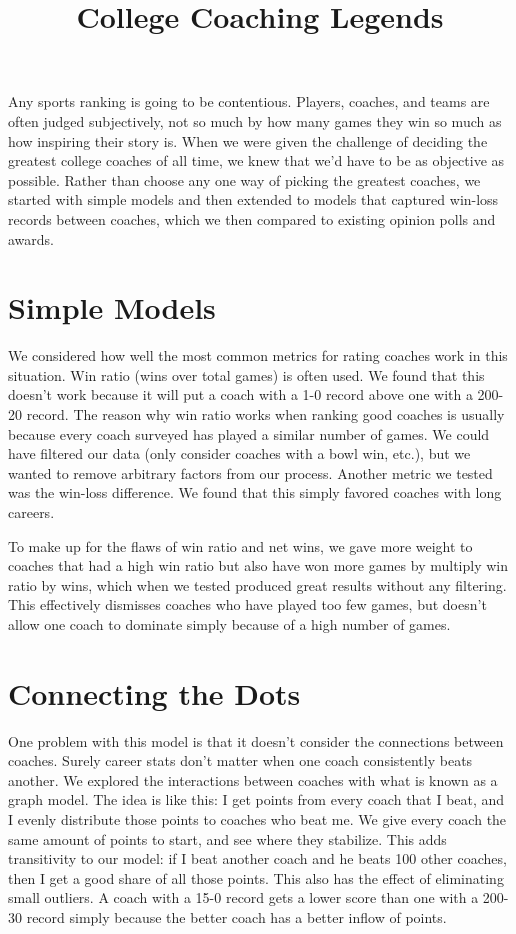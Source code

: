 \documentclass[12pt]{article}
\begin{document}
\title{College Coaching Legends}
\date{}

\maketitle
\vspace{-10ex}
Any sports ranking is going to be contentious. Players, coaches, and teams are often judged subjectively, not so much by how many games they win so much as how inspiring their story is. When we were given the challenge of deciding the greatest college coaches of all time, we knew that we'd have to be as objective as possible. Rather than choose any one way of picking the greatest coaches, we started with simple models and then extended to models that captured win-loss records between coaches, which we then compared to existing opinion polls and awards.

\section{Simple Models}
We considered how well the most common metrics for rating coaches work in this situation. Win ratio (wins over total games) is often used. We found that this doesn't work because it will put a coach with a 1-0 record above one with a 200-20 record. The reason why win ratio works when ranking good coaches is usually because every coach surveyed has played a similar number of games. We could have filtered our data (only consider coaches with a bowl win, etc.), but we wanted to remove arbitrary factors from our process. Another metric we tested was the win-loss difference. We found that this simply favored coaches with long careers.

To make up for the flaws of win ratio and net wins, we gave more weight to coaches that had a high win ratio but also have won more games by multiply win ratio by wins, which when we tested produced great results without any filtering. This effectively dismisses coaches who have played too few games, but doesn't allow one coach to dominate simply because of a high number of games.

\section{Connecting the Dots}
One problem with this model is that it doesn't consider the connections between coaches. Surely career stats don't matter when one coach consistently beats another. We explored the interactions between coaches with what is known as a graph model. The idea is like this: I get points from every coach that I beat, and I evenly distribute those points to coaches who beat me. We give every coach the same amount of points to start, and see where they stabilize. This adds transitivity to our model: if I beat another coach and he beats 100 other coaches, then I get a good share of all those points. This also has the effect of eliminating small outliers. A coach with a 15-0 record gets a lower score than one with a 200-30 record simply because the better coach has a better inflow of points.
\end{document}
